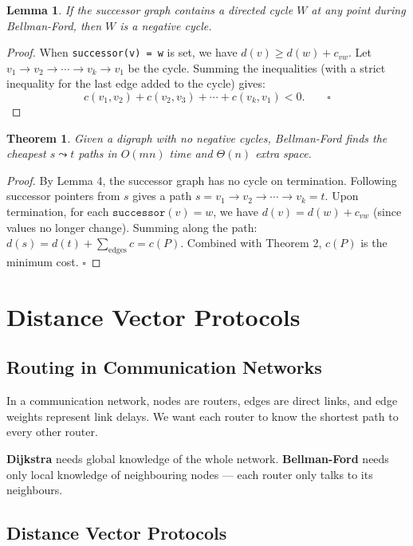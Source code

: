 \documentclass[12pt,a4paper]{report}
\newtheorem{theorem}{Theorem}
\newtheorem{lemma}{Lemma}
\begin{document}
\begin{lemma}
If the successor graph contains a directed cycle $W$ at any point during Bellman-Ford, then
$W$ is a negative cycle.
\end{lemma}

\begin{proof}
When \texttt{successor(v) = w} is set, we have $d(v) \geq d(w) + c_{vw}$. Let
$v_1 \to v_2 \to \cdots \to v_k \to v_1$ be the cycle. Summing the inequalities (with a strict
inequality for the last edge added to the cycle) gives:
\[
    c(v_1, v_2) + c(v_2, v_3) + \cdots + c(v_k, v_1) < 0. \qquad \square
\]
\end{proof}

\begin{theorem}
Given a digraph with no negative cycles, Bellman-Ford finds the cheapest $s \leadsto t$ paths
in $O(mn)$ time and $\Theta(n)$ extra space.
\end{theorem}

\begin{proof}
By Lemma 4, the successor graph has no cycle on termination. Following successor pointers from
$s$ gives a path $s = v_1 \to v_2 \to \cdots \to v_k = t$. Upon termination, for each
$\texttt{successor}(v) = w$, we have $d(v) = d(w) + c_{vw}$ (since values no longer change).
Summing along the path: $d(s) = d(t) + \sum_{\text{edges}} c = c(P)$. Combined with Theorem 2,
$c(P)$ is the minimum cost. \qquad$\square$
\end{proof}

\section{Distance Vector Protocols}

\subsection{Routing in Communication Networks}

In a communication network, nodes are routers, edges are direct links, and edge weights
represent link delays. We want each router to know the shortest path to every other router.

\textbf{Dijkstra} needs global knowledge of the whole network. \textbf{Bellman-Ford} needs
only local knowledge of neighbouring nodes — each router only talks to its neighbours.

\subsection{Distance Vector Protocols}
\end{document}

